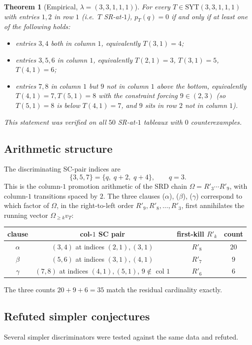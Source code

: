 \documentclass[11pt]{article}
\newtheorem{theorem}{Theorem}
\theoremstyle{definition}
\newcommand{\la}{\lambda}
\newcommand{\Om}{\Omega}
\newcommand{\SYT}{\mathrm{SYT}}
\begin{document}
\begin{theorem}[Empirical, $\la = (3,3,1,1,1)$]\label{thm:emp}
For every $T \in \SYT(3,3,1,1,1)$ with entries $1, 2$ in row $1$
(i.e.\ $T$ SR-at-$1$), $p_T(q) = 0$ if and only if at least one of
the following holds:
\begin{itemize}
\item[\textup{($\alpha$)}] entries $3, 4$ both in column $1$,
equivalently $T(3, 1) = 4$;
\item[\textup{($\beta$)}] entries $3, 5, 6$ in column $1$,
equivalently $T(2, 1) = 3$, $T(3, 1) = 5$, $T(4, 1) = 6$;
\item[\textup{($\gamma$)}] entries $7, 8$ in column $1$ but $9$ not
in column $1$ above the bottom, equivalently $T(4, 1) = 7,
T(5, 1) = 8$ with the constraint forcing $9 \in (2, 3)$ (so
$T(5,1)=8$ is below $T(4,1)=7$, and $9$ sits in row $2$ not in
column $1$).
\end{itemize}
This statement was verified on all $50$ SR-at-$1$ tableaux with $0$
counterexamples.
\end{theorem}

\subsection{Arithmetic structure}
The discriminating SC-pair indices are
\[
\{3, 5, 7\} = \{q,\; q + 2,\; q + 4\}, \qquad q = 3.
\]
This is the column-$1$ promotion arithmetic of the SRD chain
$\Om = R'_3 \cdots R'_9$, with column-$1$ transitions spaced by $2$.
The three clauses ($\alpha$), ($\beta$), ($\gamma$) correspond to
which factor of $\Om$, in the right-to-left order
$R'_9, R'_8, \ldots, R'_3$, first annihilates the running vector
$\Om_{\ge k} v_T$:
\begin{center}
\begin{tabular}{c|c|c|c}
clause & col-$1$ SC pair & first-kill $R'_k$ & count \\
\hline
$\alpha$ & $(3, 4)$ at indices $(2,1), (3,1)$ & $R'_8$ & $20$ \\
$\beta$ & $(5, 6)$ at indices $(3,1), (4,1)$ & $R'_7$ & $9$ \\
$\gamma$ & $(7, 8)$ at indices $(4,1), (5,1)$, $9 \notin $ col $1$ & $R'_6$ & $6$ \\
\end{tabular}
\end{center}
The three counts $20 + 9 + 6 = 35$ match the residual cardinality
exactly.

\subsection{Refuted simpler conjectures}
Several simpler discriminators were tested against the same data and
refuted.
\end{document}

